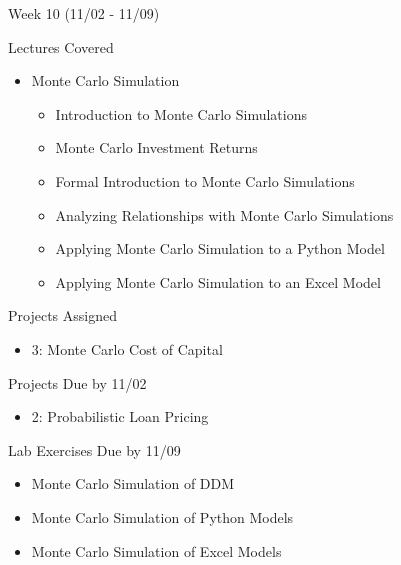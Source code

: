 \documentclass[]{article}
\begin{document}
\begin{section}{Week 10 (11/02 - 11/09)}
\begin{subsection}{Lectures Covered}
\begin{itemize}
\item Monte Carlo Simulation
\begin{itemize}
\item Introduction to Monte Carlo Simulations
\item Monte Carlo Investment Returns
\item Formal Introduction to Monte Carlo Simulations
\item Analyzing Relationships with Monte Carlo Simulations
\item Applying Monte Carlo Simulation to a Python Model
\item Applying Monte Carlo Simulation to an Excel Model
\end{itemize}
\end{itemize}
\end{subsection}
\begin{subsection}{Projects Assigned}
\begin{itemize}
\item 3: Monte Carlo Cost of Capital
\end{itemize}
\end{subsection}
\begin{subsection}{Projects Due by 11/02}
\begin{itemize}
\item 2: Probabilistic Loan Pricing
\end{itemize}
\end{subsection}
\begin{subsection}{Lab Exercises Due by 11/09}
\begin{itemize}
\item Monte Carlo Simulation of DDM
\item Monte Carlo Simulation of Python Models
\item Monte Carlo Simulation of Excel Models
\end{itemize}
\end{subsection}
\end{section}
\end{document}
